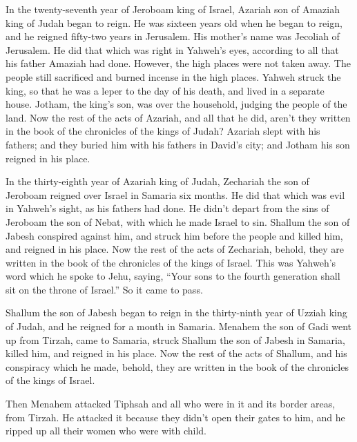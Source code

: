  In the twenty-seventh year of Jeroboam king of Israel,
Azariah son of Amaziah king of Judah began to reign.  He was
sixteen years old when he began to reign, and he reigned fifty-two years
in Jerusalem. His mother's name was Jecoliah of Jerusalem. 
He did that which was right in Yahweh's eyes, according to all that his
father Amaziah had done.  However, the high places were not
taken away. The people still sacrificed and burned incense in the high
places.  Yahweh struck the king, so that he was a leper to
the day of his death, and lived in a separate house. Jotham, the king's
son, was over the household, judging the people of the land.
 Now the rest of the acts of Azariah, and all that he did,
aren't they written in the book of the chronicles of the kings of Judah?
 Azariah slept with his fathers; and they buried him with
his fathers in David's city; and Jotham his son reigned in his place.

 In the thirty-eighth year of Azariah king of Judah,
Zechariah the son of Jeroboam reigned over Israel in Samaria six months.
 He did that which was evil in Yahweh's sight, as his
fathers had done. He didn't depart from the sins of Jeroboam the son of
Nebat, with which he made Israel to sin.  Shallum the son
of Jabesh conspired against him, and struck him before the people and
killed him, and reigned in his place.  Now the rest of the
acts of Zechariah, behold, they are written in the book of the
chronicles of the kings of Israel.  This was Yahweh's word
which he spoke to Jehu, saying, ``Your sons to the fourth generation
shall sit on the throne of Israel.'' So it came to pass.

 Shallum the son of Jabesh began to reign in the
thirty-ninth year of Uzziah king of Judah, and he reigned for a month in
Samaria.  Menahem the son of Gadi went up from Tirzah, came
to Samaria, struck Shallum the son of Jabesh in Samaria, killed him, and
reigned in his place.  Now the rest of the acts of Shallum,
and his conspiracy which he made, behold, they are written in the book
of the chronicles of the kings of Israel.

 Then Menahem attacked Tiphsah and all who were in it and
its border areas, from Tirzah. He attacked it because they didn't open
their gates to him, and he ripped up all their women who were with
child.


